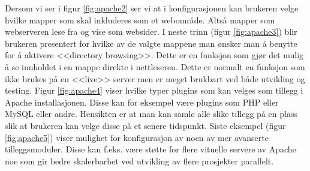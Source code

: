 Dersom vi ser i figur \ref{fig:apache2} ser vi at i konfigurasjonen kan brukeren velge hvilke mapper som skal inkluderes som et webområde. Altså mapper som webserveren lese fra og vise som websider.
I neste trinn (figur \ref{fig:apache3}) blir brukeren presentert for hvilke av de valgte mappene man ønsker man å benytte for å aktivere <<directory browsing>>. Dette er en funksjon som gjør det mulig å se innholdet i en mappe direkte i nettleseren. Dette er normalt en funksjon som ikke brukes på en <<live>> server men er meget brukbart ved både utvikling og testing. 
Figur \ref{fig:apache4} viser hvilke typer plugins som kan velges som tillegg i Apache installasjonen. Disse kan for eksempel være plugins som PHP eller MySQL eller andre. Hensikten er at man kan samle alle slike tillegg på en plass slik at brukeren kan velge disse på et senere tidspunkt.
Siste eksempel (figur \ref{fig:apache5}) viser mulighet for konfigurasjon av noen av mer avanserte tilleggsmoduler. Disse kan f.eks. være støtte for flere vituelle servere av Apache noe som gir bedre skalerbarhet ved utvikling av flere prosjekter parallelt. 
